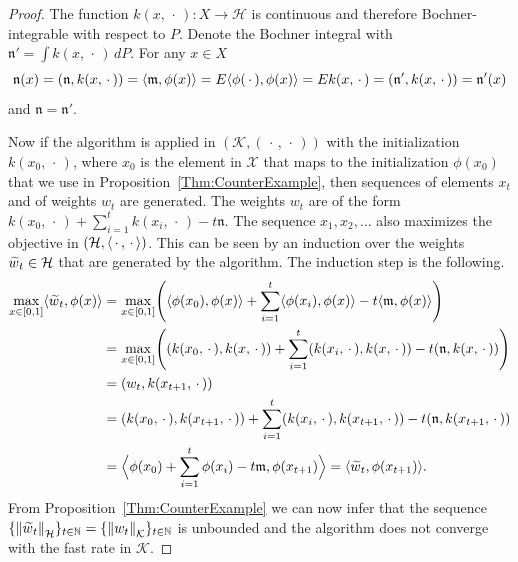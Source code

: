 \documentclass[AHL,Unicode,longabstracts,published]{cedram}
\theoremstyle{remark}
\newcommand{\bbN}{\mathbb{N}}
\newcommand{\E}{E}
\newcommand{\X}{\mathcal{X}}
\newcommand{\cH}{\mathcal{H}}
\newcommand{\clK}{\mathcal{K}}
\newcommand{\fkn}{\mathfrak{n}}
\newcommand{\mean}{\mathfrak{m}}
\providecommand{\norm}[1]{\left\lVert#1\right\rVert}
\providecommand{\inner}[2]{\left\langle #1,#2\right\rangle}
\let\oldtilde\tilde
\renewcommand*{\tilde}[1]{\mathchoice{\widetilde{#1}}{\widetilde{#1}}{\oldtilde{#1}}{\oldtilde{#1}}}
\let\originalleft\left
\let\originalright\right
\renewcommand{\left}{\mathopen{}\mathclose\bgroup\originalleft}
\renewcommand{\right}{\aftergroup\egroup\originalright}
\newcounter{setofstep}
\newcounter{step}[setofstep]
\begin{document}
\begin{proof}
The function $k(x,\,\cdot\,): X \rightarrow \cH$ is continuous and therefore Bochner-integrable with respect to $P$. Denote the Bochner integral with $\fkn' = \int k(x,\,\cdot\,) \, dP$. For any $x \in X$
\[
\fkn(x) = (\fkn, k(x,\,\cdot\,)) = \inner{\mean}{\phi(x)} = \E \inner{\phi(\,\cdot\,)}{\phi(x)} =
\E k(x,\,\cdot\,) = (\fkn',k(x,\,\cdot\,)) = \fkn'(x)
\]
and $\fkn = \fkn'$.

Now if the algorithm is applied in $(\clK,(\,\cdot\,,\,\cdot\,))$ with the initialization $k(x_0,\,\cdot\,)$, where $x_0$ is the element in $\X$ that maps to the initialization $\phi(x_0)$ that we use in Proposition~\ref{Thm:CounterExample}, then sequences of elements $x_t$ and of weights $w_t$ are generated. The weights $w_t$ are of the form $k(x_0,\,\cdot\,) + \sum_{i=1}^t k(x_i,\,\cdot\,) - t \fkn$. The sequence $x_1,x_2, \dots$ also maximizes the objective in $(\cH,\inner{\,\cdot\,}{\,\cdot\,})$. This can be seen by an induction over the weights $\tilde w_t \in \cH$ that are generated by the algorithm. The induction step is the following.
\begin{align*}
\max_{x \in [0,1]} \inner{\tilde w_t}{\phi(x)} %
&= \max_{x \in [0,1]} \left(\inner{\phi(x_0)}{\phi(x)} + \sum_{i=1}^t \inner{\phi(x_i)}{\phi(x)} - t \inner{\mean}{\phi(x)}\right) \\
&= \max_{x \in [0,1]} \left((k(x_0,\,\cdot\,),k(x,\,\cdot\,)) + \sum_{i=1}^t (k(x_i,\,\cdot\,),k(x,\,\cdot\,)) - t(\fkn,k(x,\,\cdot\,))\right)\\
&= (w_t,k(x_{t+1},\,\cdot\,)) \\
&= (k(x_0,\,\cdot\,),k(x_{t+1},\,\cdot\,)) + \sum_{i=1}^t (k(x_i,\,\cdot\,),k(x_{t+1},\,\cdot\,)) - t(\fkn,k(x_{t+1},\,\cdot\,)) \\
&= \Bigl\langle \phi(x_0) + \sum_{i=1}^t \phi(x_i) -t\mean,\phi(x_{t+1})\Bigr\rangle = \inner{\tilde w_t}{\phi(x_{t+1})}.
\end{align*}
From Proposition~\ref{Thm:CounterExample} we can now infer that the sequence $\{\norm{\tilde w_t}_\cH\}_{t \in \bbN} = \{\norm{w_t}_\clK\}_{t \in \bbN}$ is unbounded and the algorithm does not converge with the fast rate in $\clK$.
\end{proof}

\clearpage
\newpage
\footnotesize
{
\makeatletter
\renewcommand*\descriptionlabel[1]{
\normalfont\bfseries #1 }
\makeatother
\printnoidxglossary[style={centerdesc},
title={List of Notation}, toctitle={List of Notation}]
 }


\newpage



\end{document}
